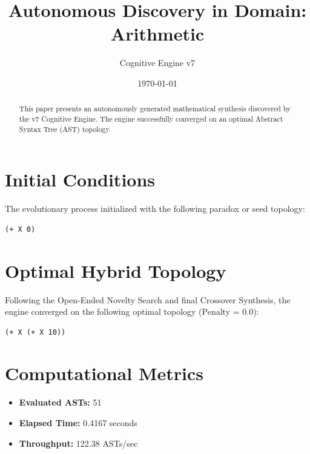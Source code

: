 \documentclass{article}
\title{Autonomous Discovery in Domain: Arithmetic}
\author{Cognitive Engine v7}
\date{\today}
\begin{document}
\maketitle
\begin{abstract}
This paper presents an autonomously generated mathematical synthesis discovered by the v7 Cognitive Engine. The engine successfully converged on an optimal Abstract Syntax Tree (AST) topology.\end{abstract}
\section{Initial Conditions}
The evolutionary process initialized with the following paradox or seed topology:
\begin{verbatim}
(+ X 0)
\end{verbatim}
\section{Optimal Hybrid Topology}
Following the Open-Ended Novelty Search and final Crossover Synthesis, the engine converged on the following optimal topology (Penalty = 0.0):
\begin{verbatim}
(+ X (+ X 10))
\end{verbatim}
\section{Computational Metrics}
\begin{itemize}
  \item \textbf{Evaluated ASTs:} 51
  \item \textbf{Elapsed Time:} 0.4167 seconds
  \item \textbf{Throughput:} 122.38 ASTs/sec
\end{itemize}
\end{document}
